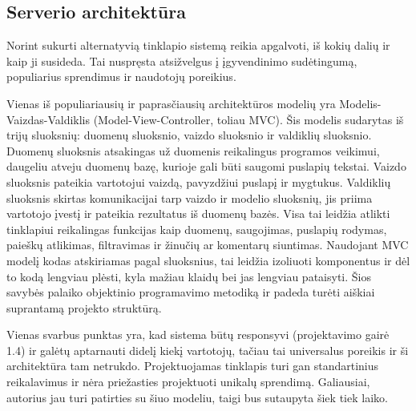\documentclass{VUMIFPSkursinis}
\begin{document}
\subsection{Serverio architektūra}
Norint sukurti alternatyvią tinklapio sistemą reikia apgalvoti, iš kokių dalių ir kaip ji susideda. Tai nuspręsta atsižvelgus į įgyvendinimo sudėtingumą, populiarius sprendimus ir naudotojų poreikius.

Vienas iš populiariausių ir paprasčiausių architektūros modelių yra Modelis-Vaizdas-Valdiklis (Model-View-Controller, toliau MVC)\cite{MVCDefinition}. Šis modelis sudarytas iš trijų sluoksnių: duomenų sluoksnio, vaizdo sluoksnio ir valdiklių sluoksnio. Duomenų sluoksnis atsakingas už duomenis reikalingus programos veikimui, daugeliu atveju duomenų bazę, kurioje gali būti saugomi puslapių tekstai\cite{MVCSO3}. Vaizdo sluoksnis pateikia vartotojui vaizdą, pavyzdžiui puslapį ir mygtukus. Valdiklių sluoksnis skirtas komunikacijai tarp vaizdo ir modelio sluoksnių, jis priima vartotojo įvestį ir pateikia rezultatus iš duomenų bazės. Visa tai leidžia atlikti tinklapiui reikalingas funkcijas kaip duomenų, saugojimas, puslapių rodymas, paieškų atlikimas, filtravimas ir žinučių ar komentarų siuntimas. Naudojant MVC modelį kodas atskiriamas pagal sluoksnius, tai leidžia izoliuoti komponentus ir dėl to kodą lengviau plėsti, kyla mažiau klaidų bei jas lengviau pataisyti. Šios savybės palaiko objektinio programavimo metodiką ir padeda turėti aiškiai suprantamą projekto struktūrą.

Vienas svarbus punktas yra, kad sistema būtų responsyvi (projektavimo gairė 1.4) ir galėtų aptarnauti didelį kiekį vartotojų, tačiau tai universalus poreikis ir ši architektūra tam netrukdo. Projektuojamas tinklapis turi gan standartinius reikalavimus ir nėra priežasties projektuoti unikalų sprendimą\cite{MVCSO1, MVCSO2}. Galiausiai, autorius jau turi patirties su šiuo modeliu, taigi bus sutaupyta šiek tiek laiko.


\end{document}

